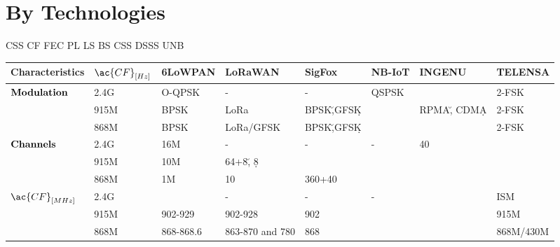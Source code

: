 \onecolumn
\section{By Technologies}
\setlength{\hoffset}{-.5in}

\ac{CSS} \ac{CF} \ac{FEC}  \ac{PL} \ac{LS} \ac{BS} \ac{CSS} \ac{DSSS} \ac{UNB}


\begin{longtable}{l|l|l|l|l|l|l|l}
	\bf{Characteristics}               & $\ac{CF}_{[Hz]}$ & \bf{6LoWPAN} & \bf{LoRaWAN}     & \bf{SigFox}   & \bf{NB-IoT} & \textbf{INGENU}    & \textbf{TELENSA}\\\hline
	\multirow{3}{*}{$\bf{Modulation}$} & 2.4G             & O-QPSK       & -                & -             & QSPSK       &                    & 2-FSK           \\
	\                                  & 915M             & BPSK         & LoRa             & BPSK\u,GFSK\d &             & RPMA\u,	CDMA\d     & 2-FSK           \\
	\                                  & 868M             & BPSK         & LoRa/GFSK        & BPSK\u,GFSK\d &             &                    & 2-FSK           \\\hline
	\multirow{3}{*}{$\bf{Channels}$}   & 2.4G             & 16M          & -                & -             & -           & 40                 & \ko             \\
	\                                  & 915M             & 10M          & 64+8\u, 8\d      & \ko           & \ko         & \ko                & \ko             \\
	\                                  & 868M             & 1M           & 10               & 360+40        & \ko         & \ko                & \ko             \\\hline
	\multirow{2}{*}{$\ac{CF}_{[MHz]}$} & 2.4G             & \ko          & -                & -             & -           & \ko                & ISM             \\
	\                                  & 915M             & 902-929      & 902-928          & 902           & \ko         & \ko                & 915M            \\
	\                                  & 868M             & 868-868.6    & 863-870 and 780  & 868           & \ko         & \ko                & 868M/430M       \\\hline

\end{longtable}
